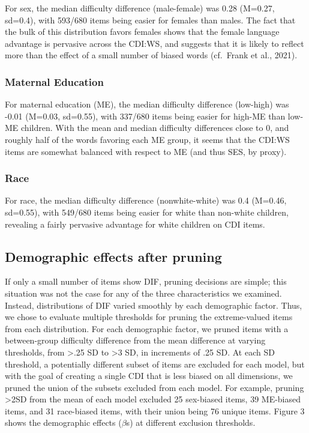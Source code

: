 \documentclass[10pt, letterpaper]{article}
\begin{document}
For sex, the median difficulty difference (male-female) was 0.28
(M=0.27, sd=0.4), with 593/680 items being easier for females than
males. The fact that the bulk of this distribution favors females shows
that the female language advantage is pervasive across the CDI:WS, and
suggests that it is likely to reflect more than the effect of a small
number of biased words (cf.~Frank et al., 2021).

\hypertarget{maternal-education}{%
\subsubsection{Maternal Education}\label{maternal-education}}

For maternal education (ME), the median difficulty difference (low-high)
was -0.01 (M=0.03, sd=0.55), with 337/680 items being easier for high-ME
than low-ME children. With the mean and median difficulty differences
close to 0, and roughly half of the words favoring each ME group, it
seems that the CDI:WS items are somewhat balanced with respect to ME
(and thus SES, by proxy).

\hypertarget{race}{%
\subsubsection{Race}\label{race}}

For race, the median difficulty difference (nonwhite-white) was 0.4
(M=0.46, sd=0.55), with 549/680 items being easier for white than
non-white children, revealing a fairly pervasive advantage for white
children on CDI items.

\hypertarget{demographic-effects-after-pruning}{%
\subsection{Demographic effects after
pruning}\label{demographic-effects-after-pruning}}

If only a small number of items show DIF, pruning decisions are simple;
this situation was not the case for any of the three characteristics we
examined. Instead, distributions of DIF varied smoothly by each
demographic factor. Thus, we chose to evaluate multiple thresholds for
pruning the extreme-valued items from each distribution. For each
demographic factor, we pruned items with a between-group difficulty
difference from the mean difference at varying thresholds, from
\textgreater.25 SD to \textgreater3 SD, in increments of .25 SD. At each
SD threshold, a potentially different subset of items are excluded for
each model, but with the goal of creating a single CDI that is less
biased on all dimensions, we pruned the union of the subsets excluded
from each model. For example, pruning \textgreater2SD from the mean of
each model excluded 25 sex-biased items, 39 ME-biased items, and 31
race-biased items, with their union being 76 unique items. Figure 3
shows the demographic effects (\(\beta\)s) at different exclusion
thresholds.
\end{document}

